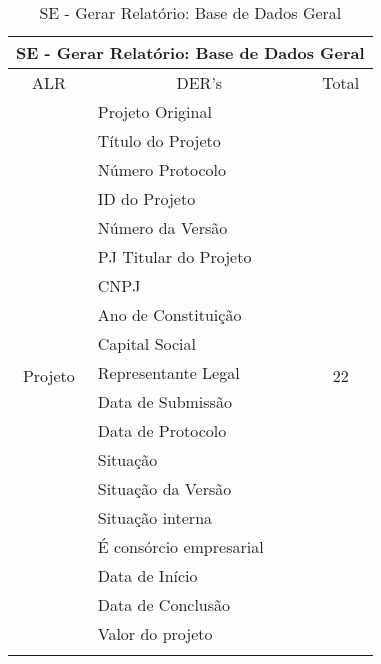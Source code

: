     \begin{table}[!h]
    \centering
    \caption{SE - Gerar Relatório: Base de Dados Geral}
    \label{se_base_geral}
    \begin{tabular}{|c|l|c|}
    \hline
    \multicolumn{3}{|c|}{SE - Gerar Relatório: Base de Dados Geral}                 \\ \hline
    ALR                         & \multicolumn{1}{c|}{DER's}    & Total                \\ \hline
    \multirow{21}{*}{Projeto}   & Projeto Original              & \multirow{21}{*}{22} \\ \cline{2-2}
				& Título do Projeto             &                      \\ \cline{2-2}
				& Número Protocolo              &                      \\ \cline{2-2}
				& ID do Projeto                 &                      \\ \cline{2-2}
				& Número da Versão              &                      \\ \cline{2-2}
				& PJ Titular do Projeto         &                      \\ \cline{2-2}
				& CNPJ                          &                      \\ \cline{2-2}
				& Ano de Constituição           &                      \\ \cline{2-2}
				& Capital Social                &                      \\ \cline{2-2}
				& Representante Legal           &                      \\ \cline{2-2}
				& Data de Submissão             &                      \\ \cline{2-2}
				& Data de Protocolo             &                      \\ \cline{2-2}
				& Situação                      &                      \\ \cline{2-2}
				& Situação da Versão            &                      \\ \cline{2-2}
				& Situação interna              &                      \\ \cline{2-2}
				& É consórcio empresarial       &                      \\ \cline{2-2}
				& Data de Início                &                      \\ \cline{2-2}
				& Data de Conclusão             &                      \\ \cline{2-2}
				& Valor do projeto              &                      \\ \cline{2-2}

\end{tabular}
\end{table}
